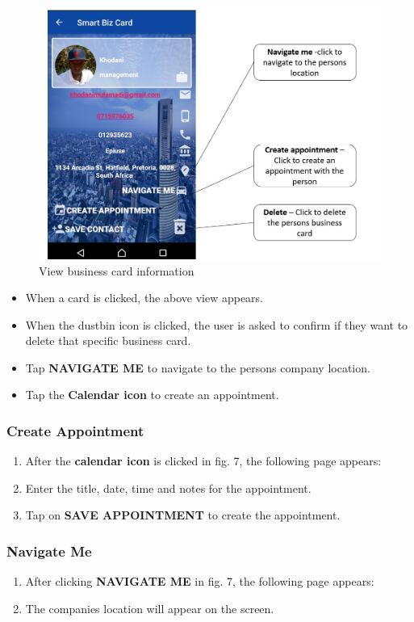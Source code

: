 \documentclass[english]{article}
\begin{document}
		\begin{figure}[H]
			\centering
			\includegraphics[scale=0.5]{person.jpg}
			\caption{View business card information}
			\label{figure: 7}
		\end{figure}
		\begin{itemize}
			\item When a card is clicked, the above view appears.
			\item When the dustbin icon is clicked, the user is asked to confirm if they want to delete that specific business card.
			\item Tap \textbf{NAVIGATE ME} to navigate to the persons company location.
			\item Tap the \textbf{Calendar icon} to create an appointment. 
		\end{itemize}
	\subsubsection{Create Appointment}
		\begin{enumerate}
			\item After the \textbf{calendar icon} is clicked in fig. 7, the following page appears:
			
			\item Enter the title, date, time and notes for the appointment.
			\item Tap on \textbf{SAVE APPOINTMENT} to create the appointment.
		\end{enumerate}
		
	\subsubsection{Navigate Me}
		\begin{enumerate}
			\item After clicking \textbf{NAVIGATE ME} in fig. 7, the following page appears:
			
			\item The companies location will appear on the screen.
		\end{enumerate}
\end{document}

